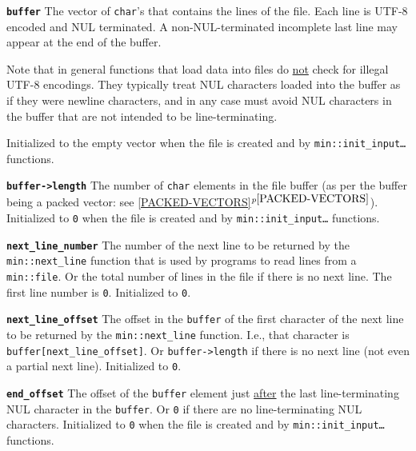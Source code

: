 \documentclass[12pt]{article}
\makeatletter
\newcommand{\ttmkey}[2]{{\tt \bf #1}\index{#1@{\tt #1}!#2}}
\newcommand{\itemref}[1]{\ref{#1}$^{p\pageref{#1}}$}
\newcommand{\EOL}{\penalty \exhyphenpenalty}
\newcommand{\GT}{{\tt >}}
\newenvironment{itemlist}[1][1.2in]%
	{\begin{list}{}{\setlength{\labelwidth}{#1}%
		        \setlength{\leftmargin}{\labelwidth}%
		        \addtolength{\leftmargin}{+0.2in}%
		        \renewcommand{\makelabel}[1]{##1\hfill}}}%
	{\end{list}}
\makeatother
\begin{document}
\begin{itemlist}[1.4in]

\item[\ttmkey{buffer}{in {\tt min::file}}]
The vector of {\tt char}'s that contains the lines of the file.  Each
line is UTF-8 encoded and NUL terminated.  A non-NUL-terminated incomplete
last line may appear at the end of the buffer.

Note that in general functions that load data into files do \underline{not}
check for illegal UTF-8 encodings.  They typically treat NUL characters
loaded into the buffer as if they were newline characters, and in any
case must avoid NUL characters in the buffer that are not intended
to be line-terminating.

Initialized to the empty vector when the file is created and by
{\tt min::\EOL init\_\EOL input\ldots} functions.

\item[\ttmkey{buffer-\GT length}{in {\tt min::file}}]
The number of {\tt char} elements in the file buffer
(as per the buffer being a packed vector: see \itemref{PACKED-VECTORS}).
Initialized to {\tt 0} when the file is created and by
{\tt min::\EOL init\_\EOL input\ldots} functions.

\item[\ttmkey{next\_\EOL line\_\EOL number}{in {\tt min::file}}]
The number of the next line to be returned by the
{\tt min::\EOL next\_\EOL line}
function that is used by programs to read lines from a {\tt min::\EOL file}.
Or the total number of lines in the file if there is no next line.
The first line number is {\tt 0}.  Initialized to {\tt 0}.

\item[\ttmkey{next\_\EOL line\_\EOL offset}{in {\tt min::file}}]
The offset in the {\tt buffer} of the first character of the
next line to be returned by the {\tt min::\EOL next\_\EOL line}
function.  I.e., that character is {\tt buffer[next\_\EOL line\_\EOL offset]}.
Or {\tt buffer->\EOL length} if there is no next line (not even a partial
next line).
Initialized to {\tt 0}.

\item[\ttmkey{end\_\EOL offset}{in {\tt min::file}}]
The offset of the {\tt buffer} element just \underline{after} the last
line-terminating NUL character in the {\tt buffer}.  Or {\tt 0} if there
are no line-terminating NUL characters.
Initialized to {\tt 0} when the file is created and by
{\tt min::\EOL init\_\EOL input\ldots} functions.


\end{itemlist}
\end{document}
